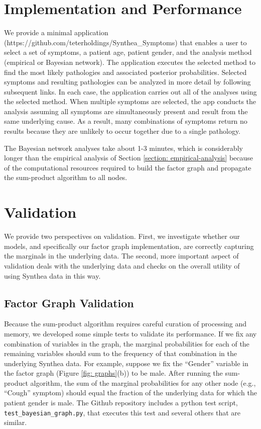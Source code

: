 \documentclass[11pt]{article}
\begin{document}
\section{Implementation and Performance}

We provide a minimal application (https://github.com/teterholdings/Synthea\_Symptoms) that enables a user to select a set of symptoms, a patient age, patient gender, and the analysis method (empirical or Bayesian network).  The application executes the selected method to find the most likely pathologies and associated posterior probabilities.  Selected symptoms and resulting pathologies can be analyzed in more detail by following subsequent links.  In each case, the application carries out all of the analyses using the selected method.  When multiple symptoms are selected, the app conducts the analysis assuming all symptoms are simultaneously present and result from the same underlying cause.  As a result, many combinations of symptoms return no results because they are unlikely to occur together due to a single pathology.

The Bayesian network analyses take about 1-3 minutes, which is considerably longer than the empirical analysis of Section \ref{section: empirical-analysis} because of the computational resources required to build the factor graph and propagate the sum-product algorithm to all nodes.  

\section{Validation}

We provide two perspectives on validation.  First, we investigate whether our models, and specifically our factor graph implementation, are correctly capturing the marginals in the underlying data.  The second, more important aspect of validation deals with the underlying data and checks on the overall utility of using Synthea data in this way.

\subsection{Factor Graph Validation}

Because the sum-product algorithm requires careful curation of processing and memory, we developed some simple tests to validate its performance.  If we fix any combination of variables in the graph, the marginal probabilities for each of the remaining variables should sum to the frequency of that combination in the underlying Synthea data.  For example, suppose we fix the ``Gender'' variable in the factor graph (Figure \ref{fig: graphs}(b)) to be male.  After running the sum-product algorithm, the sum of the marginal probabilities for any other node (e.g., ``Cough'' symptom) should equal the fraction of the underlying data for which the patient gender is male.  The Github repository includes a python test script, \texttt{test\_bayesian\_graph.py}, that executes this test and several others that are similar.
\end{document}
